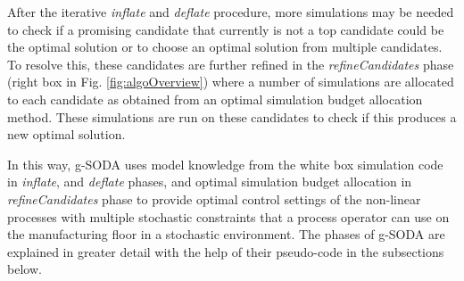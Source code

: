 \documentclass[a4paper, 12pt]{article} %
\begin{document}
After the iterative \textit{inflate} and \textit{deflate} procedure, more simulations may be needed to check if a promising candidate that currently is not a top candidate could be the optimal solution or to choose an optimal solution from multiple candidates. 
To resolve this, these candidates are further refined in the \textit{refineCandidates} phase (right box in Fig. \ref{fig:algoOverview}) where a number of simulations are allocated to each candidate as obtained from an optimal simulation budget allocation method. These simulations are run on these candidates to check if this produces a new optimal solution.

In this way, g-SODA uses model knowledge from the white box simulation code in \textit{inflate}, and \textit{deflate} phases, and optimal simulation budget allocation in \textit{refineCandidates} phase to provide optimal control settings of the non-linear processes with multiple stochastic constraints that a process operator can use on the manufacturing floor in a stochastic environment. The phases of g-SODA are explained in greater detail with the help of their pseudo-code in the subsections below.
\end{document}

